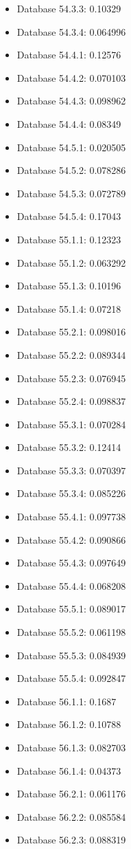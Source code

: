 \begin{itemize}
\item Database 54.3.3: 0.10329
\item Database 54.3.4: 0.064996
\item Database 54.4.1: 0.12576
\item Database 54.4.2: 0.070103
\item Database 54.4.3: 0.098962
\item Database 54.4.4: 0.08349
\item Database 54.5.1: 0.020505
\item Database 54.5.2: 0.078286
\item Database 54.5.3: 0.072789
\item Database 54.5.4: 0.17043
\item Database 55.1.1: 0.12323
\item Database 55.1.2: 0.063292
\item Database 55.1.3: 0.10196
\item Database 55.1.4: 0.07218
\item Database 55.2.1: 0.098016
\item Database 55.2.2: 0.089344
\item Database 55.2.3: 0.076945
\item Database 55.2.4: 0.098837
\item Database 55.3.1: 0.070284
\item Database 55.3.2: 0.12414
\item Database 55.3.3: 0.070397
\item Database 55.3.4: 0.085226
\item Database 55.4.1: 0.097738
\item Database 55.4.2: 0.090866
\item Database 55.4.3: 0.097649
\item Database 55.4.4: 0.068208
\item Database 55.5.1: 0.089017
\item Database 55.5.2: 0.061198
\item Database 55.5.3: 0.084939
\item Database 55.5.4: 0.092847
\item Database 56.1.1: 0.1687
\item Database 56.1.2: 0.10788
\item Database 56.1.3: 0.082703
\item Database 56.1.4: 0.04373
\item Database 56.2.1: 0.061176
\item Database 56.2.2: 0.085584
\item Database 56.2.3: 0.088319

\end{itemize}
